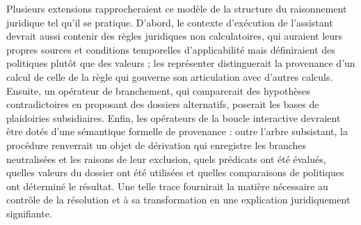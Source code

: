 \documentclass[review]{jflart}
\begin{document}
Plusieurs extensions rapprocheraient ce modèle de la structure du raisonnement
juridique tel qu'il se pratique. D'abord, le contexte d'exécution de
l'assistant devrait aussi contenir des règles juridiques non calculatoires,
qui auraient leurs propres sources et conditions temporelles d'applicabilité
mais définiraient des politiques plutôt que des valeurs ; les représenter
distinguerait la provenance d'un calcul de celle de la règle qui gouverne
son articulation avec d'autres calculs. Ensuite, un opérateur de branchement,
qui comparerait des hypothèses contradictoires en proposant des dossiers
alternatifs, poserait les bases de plaidoiries subsidiaires. Enfin, les
opérateurs de la boucle interactive devraient être dotés d'une sémantique
formelle de provenance : outre l'arbre subsistant, la procédure renverrait un
objet de dérivation qui enregistre les branches neutralisées et les raisons
de leur exclusion, quels prédicats ont été évalués, quelles valeurs du
dossier ont été utilisées et quelles comparaisons de politiques ont
déterminé le résultat. Une telle trace fournirait la matière nécessaire au
contrôle de la résolution et à sa transformation en une explication
juridiquement signifiante.




%
\end{document}
